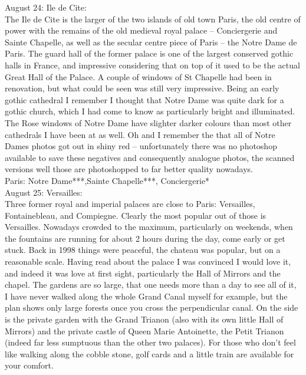 August 24: Ile de Cite:\\
The Ile de Cite is the larger of the two islands of old town Paris, the old centre of power with the remains of the old medieval royal palace -- Conciergerie and Sainte Chapelle, as well as the secular centre piece of Paris -- the Notre Dame de Paris. The guard hall of the former palace is one of the largest conserved gothic halls in France, and impressive considering that on top of it used to be the actual Great Hall of the Palace. A couple of windows of St Chapelle had been in renovation, but what could be seen was still very impressive. Being an early gothic cathedral I remember I thought that Notre Dame was quite dark for a gothic church, which I had come to know as particularly bright and illuminated. The Rose windows of Notre Dame have slighter darker colours than most other cathedrals I have been at as well. Oh and I remember the that all of Notre Dames photos got out in shiny red -- unfortunately there was no photoshop available to save these negatives and consequently analogue photos, the scanned versions well those are photoshopped to far better quality nowadays.\\ 

Paris: Notre Dame***,Sainte Chapelle***, Conciergerie*\\

August 25: Versailles:\\
Three former royal and imperial palaces are close to Paris: Versailles, Fontainebleau, and Compiegne. Clearly the most popular out of those is Versailles. Nowadays crowded to the maximum, particularly on weekends, when the fountains are running for about 2 hours during the day, come early or get stuck. Back in 1998 things were peaceful, the chateau was popular, but on a reasonable scale. Having read about the palace I was convinced I would love it, and indeed it was love at first sight, particularly the Hall of Mirrors and the chapel. The gardens are so large, that one needs more than a day to see all of it, I have never walked along the whole Grand Canal myself for example, but the plan shows only large forests once you cross the perpendicular canal. On the side is the private garden with the Grand Trianon (also with its own little Hall of Mirrors) and the private castle of Queen Marie Antoinette, the Petit Trianon (indeed far less sumptuous than the other two palaces). For those who don't feel like walking along the cobble stone, golf cards and a little train are available for your comfort.\\

